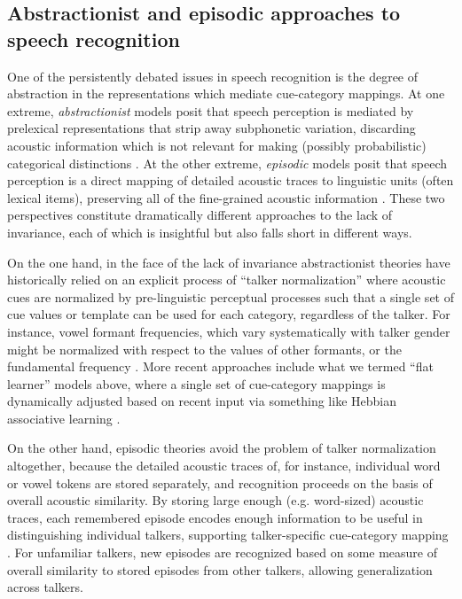 \subsection{Abstractionist and episodic approaches to speech recognition}
\label{sec:abstr-epis-theor}

One of the persistently debated issues in speech recognition is the degree of abstraction in the representations which mediate cue-category mappings.  At one extreme, \emph{abstractionist} models posit that speech perception is mediated by prelexical representations that strip away subphonetic variation, discarding acoustic information which is not relevant for making (possibly probabilistic) categorical distinctions \cite{McClelland1986,Norris1994,Norris2000,Norris2008}.  At the other extreme, \emph{episodic} models posit that speech perception is a direct mapping of detailed acoustic traces to linguistic units (often lexical items), preserving all of the fine-grained acoustic information \cite{Goldinger1998,Johnson1997a,Johnson2006,Pierrehumbert2002}.  These two perspectives constitute dramatically different approaches to the lack of invariance, each of which is insightful but also falls short in different ways.

On the one hand, in the face of the lack of invariance abstractionist theories have historically relied on an explicit process of ``talker normalization'' where acoustic cues are normalized by pre-linguistic perceptual processes such that a single set of cue values or template can be used for each category, regardless of the talker.  For instance, vowel formant frequencies, which vary systematically with talker gender \cite{Hillenbrand1995,Peterson1952} might be normalized with respect to the values of other formants, or the fundamental frequency \cite{Strange1989}.  More recent approaches include what we termed ``flat learner'' models above, where a single set of cue-category mappings is dynamically adjusted based on recent input via something like Hebbian associative learning \cite{Lancia2013,Mirman2006}.

On the other hand, episodic theories avoid the problem of talker normalization altogether, because the detailed acoustic traces of, for instance, individual word or vowel tokens are stored separately, and recognition proceeds on the basis of overall acoustic similarity.  By storing large enough (e.g. word-sized) acoustic traces, each remembered episode encodes enough information to be useful in distinguishing individual talkers, supporting talker-specific cue-category mapping \cite{Goldinger1998,Johnson1997a,Pierrehumbert2002}.  For unfamiliar talkers, new episodes are recognized based on some measure of overall similarity to stored episodes from other talkers, allowing generalization across talkers.  

